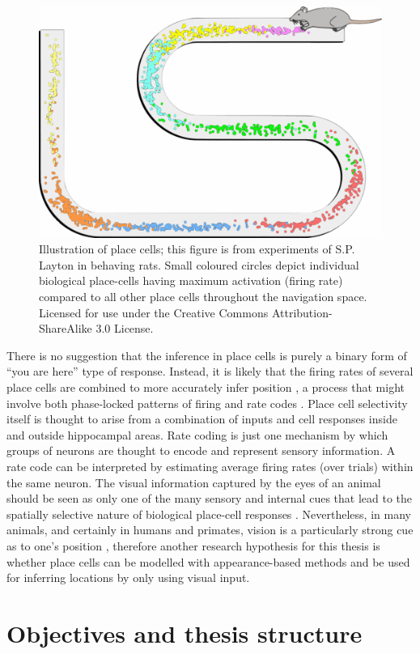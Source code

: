 \begin{figure}[!t]
\centering
\includegraphics[width=.6\linewidth]{./gfx/Chapter01/bio_place_cells_rat.pdf}
\caption{Illustration of place cells; this figure is from experiments of S.P. Layton in behaving rats. Small coloured circles depict individual biological place-cells having maximum activation (firing rate) compared to all other place cells throughout the navigation space. Licensed for use under the Creative Commons Attribution-ShareAlike 3.0 License.}
\label{fig:Maze}
\end{figure}

There is no suggestion that the inference in place cells is purely a binary form of ``you are here'' type of response.  Instead, it is likely that the firing rates of several place cells are combined to more accurately infer position \cite{hafting2005microstructure}, a process that might involve both phase-locked patterns of firing and rate codes \cite{dragoi2006temporal}. Place cell selectivity itself is thought to arise from a combination of inputs and cell responses inside and outside hippocampal areas. Rate coding \cite{van2001rate} is just one mechanism by which groups of neurons are thought to encode and represent sensory information. A rate code can be interpreted by estimating average firing rates (over trials) within the same neuron. 
The visual information captured by the eyes of an animal should be seen as only one of the many sensory and internal cues that lead to the spatially selective nature of biological place-cell responses \cite{hassabis2009decoding}. Nevertheless, in many animals, and certainly in humans and primates, vision is a particularly strong cue as to one's position \cite{epstein1998cortical}, therefore another research hypothesis for this thesis is whether place cells can be modelled with appearance-based methods and be used for inferring locations by only using visual input.


\section{Objectives and thesis structure}

